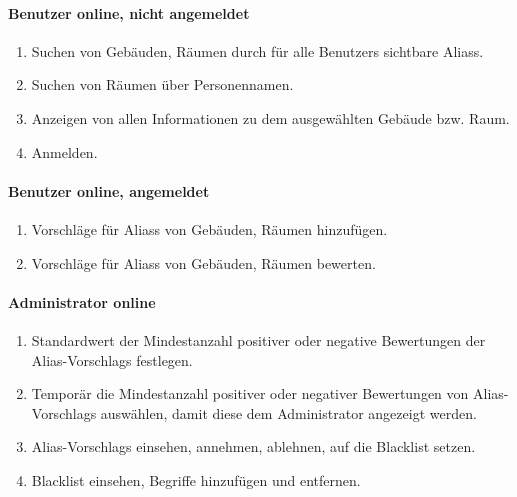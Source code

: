 \paragraph{\Gls{Benutzer} online, nicht angemeldet}
\begin{enumerate}[label=\textbf{/T\arabic*0/}, align=left, resume]
	\item Suchen von Gebäuden, Räumen durch für alle \Glspl{Benutzer} sichtbare \Glspl{Alias}.
	\item Suchen von Räumen über Personennamen.
	\item Anzeigen von allen Informationen zu dem ausgewählten Gebäude bzw. Raum.
	\item Anmelden.
\end{enumerate}

\paragraph{\Gls{Benutzer} online, angemeldet}
\begin{enumerate}[label=\textbf{/T\arabic*0/}, align=left, resume]
	\item Vorschläge für \Glspl{Alias} von Gebäuden, Räumen hinzufügen.
	\item Vorschläge für \Glspl{Alias} von Gebäuden, Räumen bewerten.
\end{enumerate}

\paragraph{\Gls{Administrator} online}
\begin{enumerate}[label=\textbf{/T\arabic*0/}, align=left, resume]
	\item Standardwert der Mindestanzahl positiver oder negative Bewertungen der \Glspl{Alias-Vorschlag} festlegen.
	\item Temporär die Mindestanzahl positiver oder negativer Bewertungen von \Glspl{Alias-Vorschlag} auswählen, damit diese dem \Gls{Administrator} angezeigt werden.
	\item \Glspl{Alias-Vorschlag} einsehen, annehmen, ablehnen, auf die \Gls{Blacklist} setzen.
	\item \Gls{Blacklist} einsehen, Begriffe hinzufügen und entfernen.
\end{enumerate}
